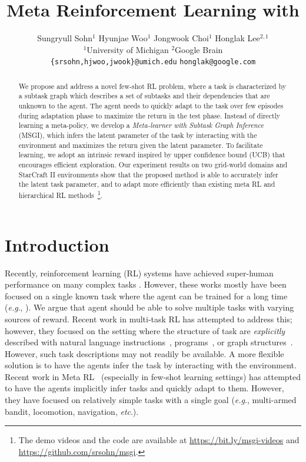 \documentclass{article} \usepackage{iclr2020_conference,times}
\title{Meta Reinforcement Learning with\\\textls[-22]{Autonomous Inference of Subtask Dependencies}}
\author{Sungryull Sohn$^{1}$        \hspace{1em}
    Hyunjae Woo$^{1}$           \hspace{1em}
    Jongwook Choi$^{1}$         \hspace{1em}
    Honglak Lee$^{2,1}$         \\[2pt]
    $^1$University of Michigan \hspace{7.5em}
    \hspace{2.3em}
    $^2$Google Brain \hspace{2.9em}
    \\
    \texttt{{\rm\{}srsohn,hjwoo,jwook{\rm\}}@umich.edu}
    \hspace{2.2em}
    \texttt{honglak@google.com} \\
}
\makeatletter
\newcommand{\nti}{{MSGI}}
\DeclareRobustCommand\onedot{\futurelet\@let@token\@onedot}
\def\onedot{.}
\def\eg{\emph{e.g}\onedot} \def\Eg{\emph{E.g}\onedot}
\newcommand{\cutabstractup}{\vspace*{-0.15in}}
\newcommand{\cutabstractdown}{\vspace*{-0.05in}}
\newcommand{\cutsectionup}{\vspace*{-0.1in}}
\newcommand{\cutsectiondown}{\vspace*{-0.05in}}
\makeatother
\begin{document}
\maketitle
\cutabstractup
\begin{abstract}
\vspace*{-5pt}
We propose and address a novel few-shot RL problem,
where a task is characterized by a subtask graph which describes a set of subtasks and their dependencies that are unknown to the agent.
The agent needs to quickly adapt to the task over few episodes during adaptation phase to maximize the return in the test phase.
Instead of directly learning a meta-policy,     we develop a \textit{Meta-learner with Subtask Graph Inference} (\nti{}),
which infers the latent parameter of the task by interacting with the environment and maximizes the return given the latent parameter.
To facilitate learning, we adopt an intrinsic reward inspired by upper confidence bound (UCB) that encourages efficient exploration.
Our experiment results on two grid-world domains and StarCraft II environments show that the proposed method is able to accurately infer the latent task parameter,
and to adapt more efficiently than existing meta RL and hierarchical RL methods~\footnote{The demo videos and the code are available at {\small\url{https://bit.ly/msgi-videos}} and\\ {\small\url{https://github.com/srsohn/msgi}}.}.


\end{abstract}
 \cutabstractdown
\cutsectionup
\section{Introduction}\label{sec:i}
\cutsectiondown

Recently, reinforcement learning (RL) systems have achieved super-human performance on many complex tasks \citep{mnih2015human,silver2016mastering,van2017hybrid}.
However, these works mostly have been focused on a single known task where the agent can be trained for a long time (\eg, \cite{silver2016mastering}).
We argue that agent should be able to solve multiple tasks with varying sources of reward.
Recent work in multi-task RL has attempted to address this; however, they focused on the setting where the structure of task are \emph{explicitly} described
with natural language instructions~\citep{oh2017zero, Andreas2017Modular, yu2017deep, chaplot2018aaai}, programs~\citep{denil2017programmable}, or graph structures~\citep{sohn2018hierarchical}. 
However, such task descriptions may not readily be available.
A more flexible solution is to have the agents infer the task by interacting with the environment.
Recent work in Meta RL~\citep{hochreiter2001learning, duan2016rl, wang2016learning, finn2017model} (especially in few-shot learning settings)
has attempted to have the agents implicitly infer tasks and quickly adapt to them.
However, they have focused on relatively simple tasks with a single goal
(\eg, multi-armed bandit, locomotion, navigation, \textit{etc}.).  
\end{document}
